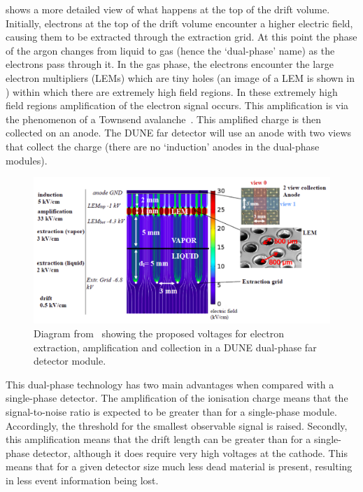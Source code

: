  shows a more detailed view of what happens at the top of the drift volume.
Initially, electrons at the top of the drift volume encounter a higher electric field, causing them to be extracted through the extraction grid.
At this point the phase of the argon changes from liquid to gas (hence the `dual-phase' name) as the electrons pass through it.
In the gas phase, the electrons encounter the large electron multipliers (LEMs) which are tiny holes (an image of a LEM is shown in ) within which there are extremely high field regions.
In these extremely high field regions amplification of the electron signal occurs.
This amplification is via the phenomenon of a Townsend avalanche~\cite{townsendAvalanche}.
This amplified charge is then collected on an anode.
The DUNE far detector will use an anode with two views that collect the charge (there are no `induction' anodes in the dual-phase modules).

\begin{figure}
  \centering
  \includegraphics[width=.8\linewidth]{files/figures/dune_detector/dualPhaseVoltage}
  \caption[Diagram showing electric fields at different near the DUNE dual-phase anode]{Diagram from~\cite{tdrVol1} showing the proposed voltages for electron extraction, amplification and collection in a DUNE dual-phase far detector module.}
  \label{fig:dualPhaseVoltage}
\end{figure}

This dual-phase technology has two main advantages when compared with a single-phase detector.
The amplification of the ionisation charge means that the signal-to-noise ratio is expected to be greater than for a single-phase module.
Accordingly, the threshold for the smallest observable signal is raised.
Secondly, this amplification means that the drift length can be greater than for a single-phase detector, although it does require very high voltages at the cathode.
This means that for a given detector size much less dead material is present, resulting in less event information being lost.

